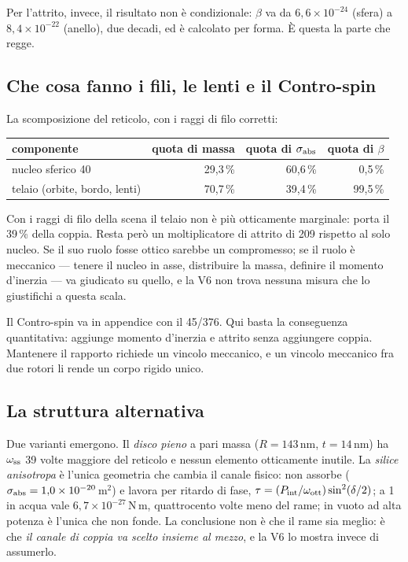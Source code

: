 \documentclass[11pt,a4paper]{article}
\providecommand{\toprule}{\hline}
\providecommand{\midrule}{\hline}
\providecommand{\bottomrule}{\hline}
\providecommand{\micro}{\textmu}
\providecommand{\SI}[2]{#1\,\text{#2}}
\begin{document}
Per l'attrito, invece, il risultato non \`e condizionale: $\beta$ va da
$6{,}6\times10^{-24}$ (sfera) a $8{,}4\times10^{-22}$ (anello), due decadi, ed \`e
calcolato per forma. \`E questa la parte che regge.

\subsection{Che cosa fanno i fili, le lenti e il Contro-spin}

La scomposizione del reticolo, con i raggi di filo corretti:
\begin{center}\small
\begin{tabular}{lrrr}
\toprule
componente & quota di massa & quota di $\sigma_{\rm abs}$ & quota di $\beta$ \\
\midrule
nucleo sferico \SI{40}{nm} & 29{,}3\,\% & 60{,}6\,\% & 0{,}5\,\% \\
telaio (orbite, bordo, lenti) & 70{,}7\,\% & 39{,}4\,\% & 99{,}5\,\% \\
\bottomrule
\end{tabular}
\end{center}
Con i raggi di filo della scena il telaio non \`e pi\`u otticamente marginale: porta il
39\,\% della coppia. Resta per\`o un moltiplicatore di attrito di 209 rispetto al solo
nucleo. Se il suo ruolo fosse ottico sarebbe un compromesso; se il ruolo \`e
meccanico --- tenere il nucleo in asse, distribuire la massa, definire il momento
d'inerzia --- va giudicato su quello, e la V6 non trova nessuna misura che lo
giustifichi a questa scala.

Il Contro-spin va in appendice con il 45/376. Qui basta la conseguenza quantitativa:
aggiunge momento d'inerzia e attrito senza aggiungere coppia. Mantenere il rapporto
richiede un vincolo meccanico, e un vincolo meccanico fra due rotori li rende un corpo
rigido unico.

\subsection{La struttura alternativa}

Due varianti emergono. Il \emph{disco pieno} a pari massa ($R=\SI{143}{nm}$,
$t=\SI{14}{nm}$) ha $\omega_{\rm ss}$ 39 volte maggiore del reticolo e nessun elemento
otticamente inutile. La \emph{silice anisotropa} \`e l'unica geometria che cambia il
canale fisico: non assorbe ($\sigma_{\rm abs}=1{,}0\times10^{-20}$\,m$^2$) e lavora
per ritardo di fase, $\tau=(P_{\rm int}/\omega_{\rm ott})\sin^2(\delta/2)$; a
\SI{1}{\micro W} in acqua vale $6{,}7\times10^{-27}$\,N\,m, quattrocento volte meno
del rame; in vuoto ad alta potenza \`e l'unica che non fonde. La conclusione non \`e
che il rame sia meglio: \`e che \emph{il canale di coppia va scelto insieme al mezzo},
e la V6 lo mostra invece di assumerlo.
\end{document}
